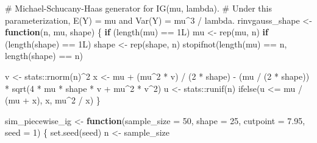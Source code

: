 \documentclass[
  english,
  letterpaper,
  DIV=11,
  numbers=noendperiod]{scrartcl}
\newenvironment{Shaded}{\begin{snugshade}}{\end{snugshade}}
\newcommand{\AttributeTok}[1]{\textcolor[rgb]{0.40,0.45,0.13}{#1}}
\newcommand{\CommentTok}[1]{\textcolor[rgb]{0.37,0.37,0.37}{#1}}
\newcommand{\ControlFlowTok}[1]{\textcolor[rgb]{0.00,0.23,0.31}{\textbf{#1}}}
\newcommand{\DecValTok}[1]{\textcolor[rgb]{0.68,0.00,0.00}{#1}}
\newcommand{\FloatTok}[1]{\textcolor[rgb]{0.68,0.00,0.00}{#1}}
\newcommand{\FunctionTok}[1]{\textcolor[rgb]{0.28,0.35,0.67}{#1}}
\newcommand{\NormalTok}[1]{\textcolor[rgb]{0.00,0.23,0.31}{#1}}
\newcommand{\OtherTok}[1]{\textcolor[rgb]{0.00,0.23,0.31}{#1}}
\newcommand{\SpecialCharTok}[1]{\textcolor[rgb]{0.37,0.37,0.37}{#1}}
\begin{document}
\begin{Shaded}
\begin{Highlighting}[]
\CommentTok{\# Michael{-}Schucany{-}Haas generator for IG(mu, lambda).}
\CommentTok{\# Under this parameterization, E(Y) = mu and Var(Y) = mu\^{}3 / lambda.}
\NormalTok{rinvgauss\_shape }\OtherTok{\textless{}{-}} \ControlFlowTok{function}\NormalTok{(n, mu, shape) \{}
  \ControlFlowTok{if}\NormalTok{ (}\FunctionTok{length}\NormalTok{(mu) }\SpecialCharTok{==} \DecValTok{1}\NormalTok{L) mu }\OtherTok{\textless{}{-}} \FunctionTok{rep}\NormalTok{(mu, n)}
  \ControlFlowTok{if}\NormalTok{ (}\FunctionTok{length}\NormalTok{(shape) }\SpecialCharTok{==} \DecValTok{1}\NormalTok{L) shape }\OtherTok{\textless{}{-}} \FunctionTok{rep}\NormalTok{(shape, n)}
  \FunctionTok{stopifnot}\NormalTok{(}\FunctionTok{length}\NormalTok{(mu) }\SpecialCharTok{==}\NormalTok{ n, }\FunctionTok{length}\NormalTok{(shape) }\SpecialCharTok{==}\NormalTok{ n)}

\NormalTok{  v }\OtherTok{\textless{}{-}}\NormalTok{ stats}\SpecialCharTok{::}\FunctionTok{rnorm}\NormalTok{(n)}\SpecialCharTok{\^{}}\DecValTok{2}
\NormalTok{  x }\OtherTok{\textless{}{-}}\NormalTok{ mu }\SpecialCharTok{+}\NormalTok{ (mu}\SpecialCharTok{\^{}}\DecValTok{2} \SpecialCharTok{*}\NormalTok{ v) }\SpecialCharTok{/}\NormalTok{ (}\DecValTok{2} \SpecialCharTok{*}\NormalTok{ shape) }\SpecialCharTok{{-}}
\NormalTok{    (mu }\SpecialCharTok{/}\NormalTok{ (}\DecValTok{2} \SpecialCharTok{*}\NormalTok{ shape)) }\SpecialCharTok{*} \FunctionTok{sqrt}\NormalTok{(}\DecValTok{4} \SpecialCharTok{*}\NormalTok{ mu }\SpecialCharTok{*}\NormalTok{ shape }\SpecialCharTok{*}\NormalTok{ v }\SpecialCharTok{+}\NormalTok{ mu}\SpecialCharTok{\^{}}\DecValTok{2} \SpecialCharTok{*}\NormalTok{ v}\SpecialCharTok{\^{}}\DecValTok{2}\NormalTok{)}
\NormalTok{  u }\OtherTok{\textless{}{-}}\NormalTok{ stats}\SpecialCharTok{::}\FunctionTok{runif}\NormalTok{(n)}
  \FunctionTok{ifelse}\NormalTok{(u }\SpecialCharTok{\textless{}=}\NormalTok{ mu }\SpecialCharTok{/}\NormalTok{ (mu }\SpecialCharTok{+}\NormalTok{ x), x, mu}\SpecialCharTok{\^{}}\DecValTok{2} \SpecialCharTok{/}\NormalTok{ x)}
\NormalTok{\}}

\NormalTok{sim\_piecewise\_ig }\OtherTok{\textless{}{-}} \ControlFlowTok{function}\NormalTok{(}\AttributeTok{sample\_size =} \DecValTok{50}\NormalTok{, }\AttributeTok{shape =} \DecValTok{25}\NormalTok{, }\AttributeTok{cutpoint =} \FloatTok{7.95}\NormalTok{, }\AttributeTok{seed =} \DecValTok{1}\NormalTok{) \{}
  \FunctionTok{set.seed}\NormalTok{(seed)}
\NormalTok{  n }\OtherTok{\textless{}{-}}\NormalTok{ sample\_size}


\end{Highlighting}
\end{Shaded}
\end{document}
